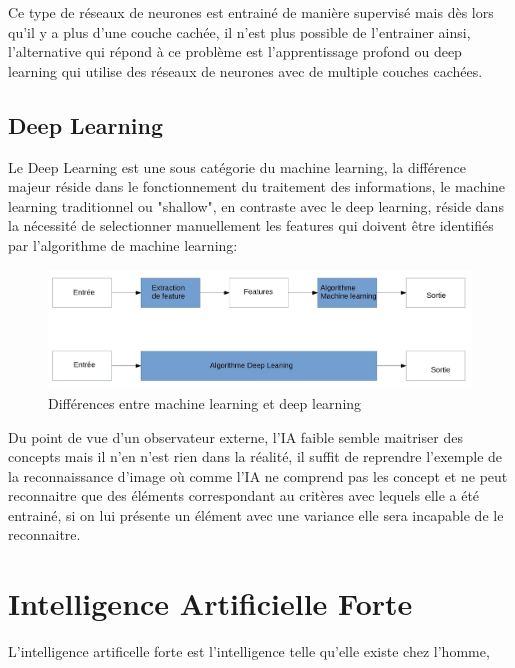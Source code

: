 Ce type de réseaux de neurones est entrainé de manière supervisé mais dès lors qu'il 
y a plus d'une couche cachée, il n'est plus possible de l'entrainer ainsi,
l'alternative qui répond à ce problème est l'apprentissage profond ou 
deep learning qui utilise des réseaux de neurones avec de multiple couches 
cachées.  


\subsection{Deep Learning}
Le Deep Learning est une sous catégorie du machine learning, 
la différence majeur réside dans le fonctionnement du traitement des 
informations, le machine learning traditionnel ou "shallow", en contraste avec le deep 
learning, réside dans la nécessité de selectionner manuellement les features 
qui doivent être identifiés par l'algorithme de machine learning:

\begin{figure}[!h]
    \centering
    \includegraphics[width=1\textwidth]{Images/MLvsDL}
    \caption{Différences entre machine learning et deep learning}
	\label{fig:DiffMLDL}
\end{figure}



\newpage
Du point de vue d'un observateur externe, l'IA faible
semble maitriser des concepts mais il n'en n'est rien dans la 
réalité, il suffit de reprendre l'exemple de la reconnaissance d'image
où comme l'IA ne comprend pas les concept et ne peut reconnaitre 
que des éléments correspondant au critères avec lequels elle a été 
entrainé, si on lui présente un élément avec une variance elle 
sera incapable de le reconnaitre.

\section{Intelligence Artificielle Forte}
L'intelligence artificelle forte est l'intelligence
telle qu'elle existe chez l'homme, 